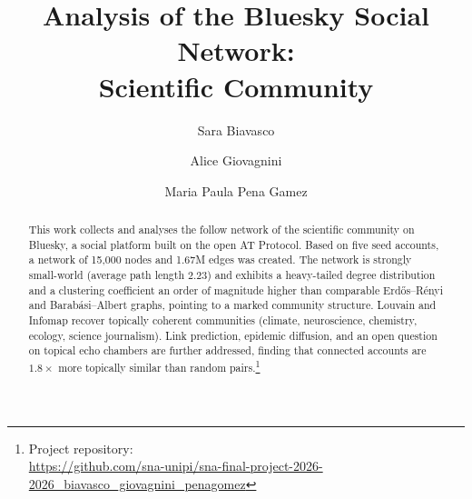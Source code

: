 \documentclass[sigchi]{acmart}
\begin{document}
\title[Analysis of the Bluesky Social Network]{Analysis of the Bluesky Social Network:\\ Scientific Community}

\author{Sara Biavasco}

\author{Alice Giovagnini}

\author{Maria Paula Pena Gamez}


\renewcommand{\shortauthors}{Biavasco, Giovagnini, Pena Gamez}


\begin{abstract}
This work collects and analyses the follow network of the scientific community on Bluesky, a social platform built on the open AT Protocol. Based on five seed accounts, a network of 15{,}000 nodes and 1.67M edges was created. The network is strongly small-world (average path length $2.23$) and exhibits a heavy-tailed degree distribution
and a clustering coefficient an order of magnitude higher than comparable Erd\H{o}s--R\'enyi and Barab\'asi--Albert graphs, pointing to a marked community structure. Louvain and Infomap recover topically coherent communities (climate, neuroscience, chemistry, ecology, science journalism). Link prediction, epidemic diffusion, and an open question on topical echo chambers are further addressed, finding that connected accounts are $1.8\times$ more topically similar than random pairs.\footnote{Project repository:\\
\url{https://github.com/sna-unipi/sna-final-project-2026-2026_biavasco_giovagnini_penagomez}}
\end{abstract}


\maketitle









\end{document}
